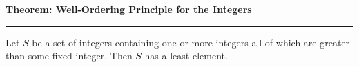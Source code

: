 \nopagenumbers
{\bf Theorem: Well-Ordering Principle for the Integers}
\vskip 1mm
\hrule

\vskip 6pt
Let $S$ be a set of integers containing one or more integers all of which are greater than some fixed integer. Then $S$ has a least element.


\vfill\eject

